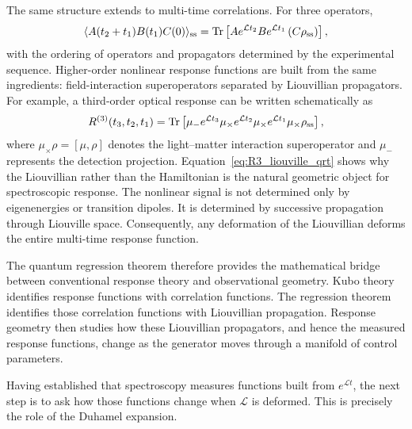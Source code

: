 The same structure extends to multi-time correlations. For
three operators,
\begin{align}
\langle A(t_2+t_1)B(t_1)C(0)\rangle_{\rm ss}
=
{\rm Tr}
\left[
A e^{\mathcal L t_2}
B e^{\mathcal L t_1}
\left(
C\rho_{\rm ss}
\right)
\right],
\end{align}
with the ordering of operators and propagators determined by
the experimental sequence. Higher-order nonlinear response
functions are built from the same ingredients: field-interaction
superoperators separated by Liouvillian propagators. For
example, a third-order optical response can be written
schematically as
\begin{align}
R^{(3)}(t_3,t_2,t_1)
=
{\rm Tr}
\left[
\mu_-
e^{\mathcal L t_3}
\mu_\times
e^{\mathcal L t_2}
\mu_\times
e^{\mathcal L t_1}
\mu_\times
\rho_{\rm ss}
\right],
\label{eq:R3_liouville_qrt}
\end{align}
where \(\mu_\times\rho=[\mu,\rho]\) denotes the
light--matter interaction superoperator and \(\mu_-\) represents
the detection projection.
Equation~\eqref{eq:R3_liouville_qrt} shows why the Liouvillian
rather than the Hamiltonian is the natural geometric object for
spectroscopic response. The nonlinear signal is not determined
only by eigenenergies or transition dipoles. It is determined by
successive propagation through Liouville space. Consequently,
any deformation of the Liouvillian deforms the entire
multi-time response function.

The quantum regression theorem therefore provides the
mathematical bridge between conventional response theory and
observational geometry. Kubo theory identifies response
functions with correlation functions. The regression theorem
identifies those correlation functions with Liouvillian
propagation. Response geometry then studies how these
Liouvillian propagators, and hence the measured response
functions, change as the generator moves through a manifold of
control parameters.

Having established that spectroscopy measures functions built
from \(e^{\mathcal L t}\), the next step is to ask how those
functions change when \(\mathcal L\) is deformed. This is
precisely the role of the Duhamel expansion.


